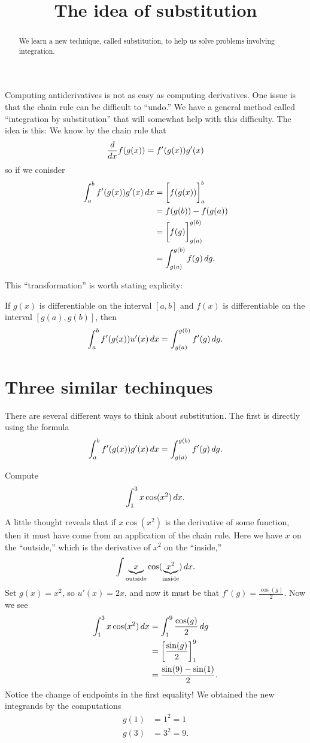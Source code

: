 \documentclass{ximera}
\title[Dig-In:]{The idea of substitution}
\begin{document}
\begin{abstract}
  We learn a new technique, called substitution, to help us solve
  problems involving integration.
\end{abstract}
\maketitle


Computing antiderivatives is not as easy as computing derivatives.
One issue is that the chain rule can be difficult to ``undo.''  We
have a general method called ``integration by substitution'' that will
somewhat help with this difficulty. The idea is this: We know by the
chain rule that
\[
\frac{d}{dx} f(g(x)) = f'(g(x))g'(x)
\]
so if we conisder
\begin{align*}
  \int_a^b f'(g(x))g'(x) \,d x &= \bigg[ f(g(x)) \bigg]_a^b \\
  &= f(g(b)) - f(g(a)) \\
  &= \bigg[ f(g) \bigg]_{g(a)}^{g(b)}\\
  &= \int_{g(a)}^{g(b)}f(g) \,d g.
\end{align*}

This ``transformation'' is worth stating explicity:

\begin{theorem} 
If $g(x)$ is differentiable on the interval $[a,b]$ and $f(x)$ is
differentiable on the interval $[g(a),g(b)]$, then
\[
\int_a^b f'(g(x)) u'(x) \,d x =\int_{g(a)}^{g(b)} f'(g) \,d g.
\]
\end{theorem}

\section{Three similar techinques}

There are several different ways to think about substitution. The
first is directly using the formula
\[
\int_a^b f'(g(x)) g'(x) \,d x = \int_{g(a)}^{g(b)} f'(g) \,d g.
\]
\begin{example}
Compute
\[
\int_1^3 x\cos(x^2)\,d x.
\]
\begin{explanation}
A little thought reveals that if $x\cos(x^2)$ is the derivative of
some function, then it must have come from an application of the chain
rule. Here we have $x$ on the ``outside,'' which is the derivative of
$x^2$ on the ``inside,'' 
\[
\int \underbrace{x}_{\text{outside}}\cos(\underbrace{x^2}_{\text{inside}})\,d x.
\]
Set $g(x) = x^2$, so $u'(x) = 2x$, and now it must be that $f'(g) =
\frac{\cos(g)}{2}$. Now we see
\begin{align*}
\int_1^3 x\cos(x^2)\,d x &= \int_1^9 \frac{\cos(g)}{2}\,d g\\
&= \bigg[ \frac{\sin(g)}{2} \bigg]_1^9 \\
&= \frac{\sin(9) -\sin(1)}{2}.
\end{align*}
Notice the change of endpoints in the first equality!  
We obtained the new integrands by the computations
\begin{align*}
g(1) &= 1^2 = 1  \\
g(3) &= 3^2 = 9.
\end{align*}
\end{explanation}
\end{example}
\end{document}
